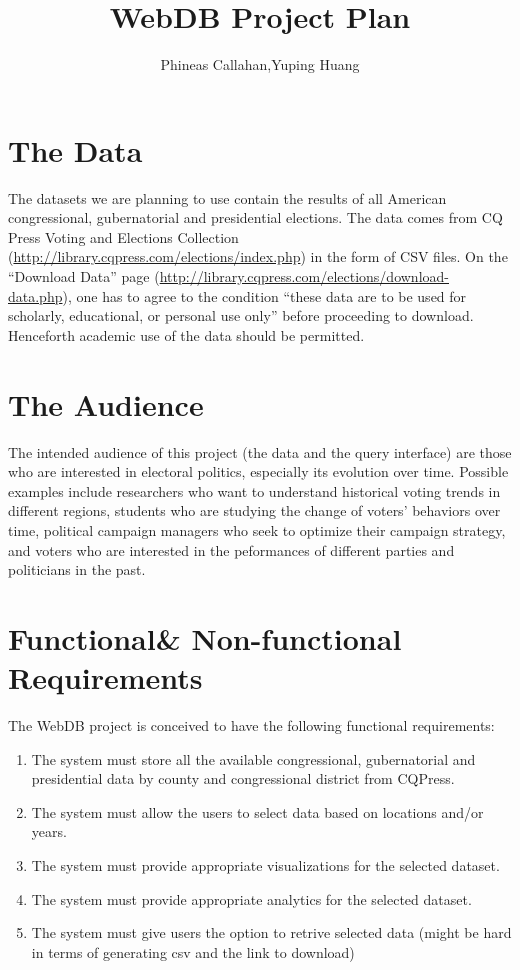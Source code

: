 \documentclass[12pt]{article}
\title{WebDB Project Plan}
\author{Phineas Callahan,Yuping Huang}
\begin{document}
 \maketitle

\section{The Data}
The datasets we are planning to use contain the results of all American congressional, gubernatorial and presidential 
elections. The data comes from CQ Press Voting and Elections Collection (\url{http://library.cqpress.com/elections/index.php}) in the form of CSV files. On the “Download Data” page 
(\url{http://library.cqpress.com/elections/download-data.php}),
one has to agree to the condition “these data are to be used for scholarly, educational, or personal use only” 
before proceeding to download. Henceforth academic use of the data should be permitted.

\section{The Audience}
The intended audience of this project (the data and the query interface) are those who are interested in electoral
politics, especially its evolution over time. Possible examples include researchers who want to understand historical voting trends in different
regions, students who are studying the change of voters' behaviors over time, political campaign managers who seek
to optimize their campaign strategy, and voters who are interested in the peformances of different parties and politicians
in the past.

\section{Functional\& Non-functional Requirements}
The WebDB project is conceived to have the following functional requirements:
\begin{enumerate}
 \item The system must store all the available congressional, gubernatorial and presidential data by county and congressional district from CQPress.
 \item The system must allow the users to select data based on locations and/or years.
 \item The system must provide appropriate visualizations for the selected dataset.
 \item The system must provide appropriate analytics for the selected dataset.
 \item The system must give users the option to retrive selected data (might be hard in terms of generating csv and the link to download)
\end{enumerate}
\end{document}

